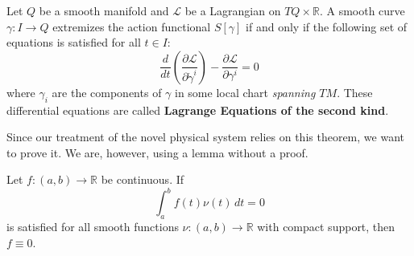 \begin{theorem}
    Let $Q$ be a smooth manifold and $\mathcal{L}$ be a Lagrangian on $TQ \times \mathbb{R}$. A smooth curve $\gamma: I \to Q$ extremizes the action functional $S[\gamma]$ if and only if the following set of equations is satisfied for all $t \in I$:
    \begin{equation}
        \frac{d}{dt} \left( \frac{\partial \mathcal{L}}{\partial \dot{\gamma}^i} \right) - \frac{\partial \mathcal{L}}{\partial \gamma^i} = 0
    \end{equation}
    where $\gamma_i$ are the components of $\gamma$ in some local chart \emph{spanning $TM$}. These differential equations are called \textbf{Lagrange Equations of the second kind}.
\end{theorem}
Since our treatment of the novel physical system relies on this theorem, we want to prove it. We are, however, using a lemma without a proof.
\begin{lemma}
    Let $f: (a,b) \to \mathbb{R}$ be continuous. If 
    \[
        \int_a^b f(t) \nu (t) \, dt = 0
    \] is satisfied for all smooth functions $\nu: (a,b) \to \mathbb{R}$ with compact support, then $f \equiv 0$. 
\end{lemma}
